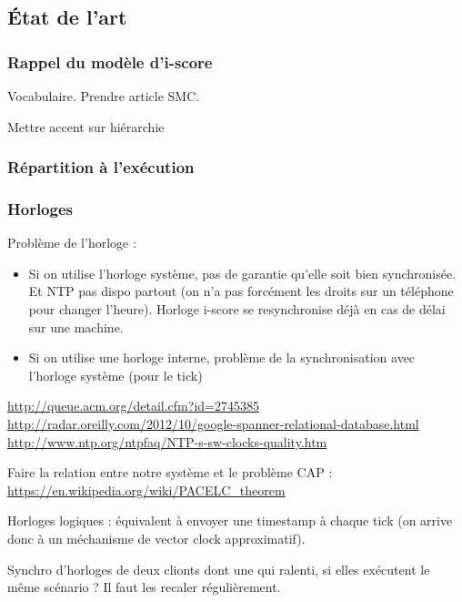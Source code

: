 \documentclass{article}
\begin{document}
\subsection{État de l'art}
\subsubsection{Rappel du modèle d'i-score}
\cite{celerier2015ossia}
Vocabulaire. Prendre article SMC.

Mettre accent sur hiérarchie
\subsubsection{Répartition à l'exécution}


\subsubsection{Horloges}
Problème de l'horloge : 
\begin{itemize}
\item Si on utilise l'horloge système, pas de garantie qu'elle soit bien synchronisée. 
Et NTP pas dispo partout (on n'a pas forcément les droits sur un téléphone pour changer l'heure).
Horloge i-score se resynchronise déjà en cas de délai sur une machine.
\item Si on utilise une horloge interne, problème de la synchronisation avec l'horloge système (pour le tick)
\end{itemize}

\url{http://queue.acm.org/detail.cfm?id=2745385}
\url{http://radar.oreilly.com/2012/10/google-spanner-relational-database.html}
\url{http://www.ntp.org/ntpfaq/NTP-s-sw-clocks-quality.htm}

Faire la relation entre notre système et le problème CAP : \url{https://en.wikipedia.org/wiki/PACELC_theorem}

Horloges logiques : équivalent à envoyer une timestamp à chaque tick (on arrive donc à un méchanisme de vector clock approximatif). 

Synchro d'horloges de deux clionts dont une qui ralenti, si elles exécutent le même 
scénario ? Il faut les recaler régulièrement. 
\end{document}
